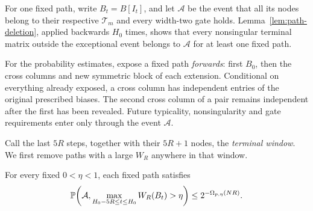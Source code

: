 For one fixed path, write \(B_t=B[I_t]\), and let
\(\mathcal A\) be the event that all its nodes belong to their
respective \(\mathcal T_m\) and every width-two gate holds.
Lemma~\ref{lem:path-deletion}, applied backwards \(H_0\) times,
shows that every nonsingular terminal matrix outside the exceptional
event belongs to \(\mathcal A\) for at least one fixed path.

For the probability estimates, expose a fixed path \emph{forwards}:
first \(B_0\), then the cross columns and new symmetric block of
each extension. Conditional on everything already exposed, a cross
column has independent entries of the original prescribed biases.
The second cross column of a pair remains independent after the first
has been revealed. Future typicality, nonsingularity and gate
requirements enter only through the event \(\mathcal A\).

Call the last \(5R\) steps, together with their \(5R+1\) nodes,
the \emph{terminal window}. We first remove paths with a large
\(W_R\) anywhere in that window.

\begin{lemma}\label{lem:path-high-tail}
For every fixed \(0<\eta<1\), each fixed path satisfies
\begin{equation}\label{eq:path-high-tail}
 \mathbb P\!\left(\mathcal A,
       \max_{H_0-5R\le t\le H_0} W_R(B_t)>\eta\right)
       \le2^{-\Omega_{p,\eta}(NR)}.
\end{equation}
\end{lemma}

